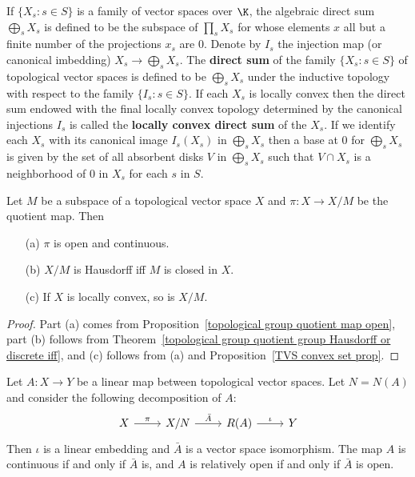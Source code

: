 \begin{example}
If $\{X_s:s\in S\}$ is a family of vector spaces over $\K$, the algebraic direct sum $\bigoplus_sX_s$ is defined to be the subspace of $\prod_sX_s$ for whose elements $x$ all but a finite number of the projections $x_s$ are $0$. Denote by $I_s$ the injection map (or canonical imbedding) $X_s\to\bigoplus_sX_s$. The \textbf{direct sum} of the family $\{X_s:s\in S\}$ of topological vector spaces is defined to be $\bigoplus_sX_s$ under the inductive topology with respect to the family $\{I_s:s\in S\}$. If each $X_s$ is locally convex then the direct sum endowed with the final locally convex topology determined by the canonical injections $I_s$ is called the \textbf{locally convex direct sum} of the $X_s$. If we identify each $X_s$ with its canonical image $I_s(X_s)$ in $\bigoplus_sX_s$ then a base at $0$ for $\bigoplus_sX_s$ is given by the set of all absorbent disks $V$ in $\bigoplus_sX_s$ such that $V\cap X_s$ is a neighborhood of $0$ in $X_s$ for each $s$ in $S$.
\end{example}
\begin{proposition}\label{TVS quotient topo prop}
Let $M$ be a subspace of a topological vector space $X$ and $\pi:X\to X/M$ be the quotient map. Then
\begin{itemize}
\item[(a)] $\pi$ is open and continuous.
\item[(b)] $X/M$ is Hausdorff iff $M$ is closed in $X$.
\item[(c)] If $X$ is locally convex, so is $X/M$.
\end{itemize}
\end{proposition}
\begin{proof}
Part (a) comes from Proposition~\ref{topological group quotient map open}, part (b) follows from Theorem~\ref{topological group quotient group Hausdorff or discrete iff}, and (c) follows from (a) and Proposition~\ref{TVS convex set prop}.
\end{proof}
\begin{proposition}\label{TVS first isomorphism thm}
Let $A:X\to Y$ be a linear map between topological vector spaces. Let $N=N(A)$ and consider the following decomposition of $A$:
\[\begin{tikzcd}
X\ar[r,"\pi"]&X/N\ar[r,"\bar{A}"]&R(A)\ar[r,"\iota"]&Y
\end{tikzcd}\]
Then $\iota$ is a linear embedding and $\bar{A}$ is a vector space isomorphism. The map $A$ is continuous if and only if $\bar{A}$ is, and $A$ is relatively open if and only if $\bar{A}$ is open.
\end{proposition}
